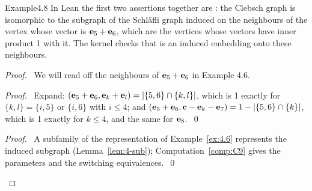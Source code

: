 \begin{cgss}{Example}{4.8}\label{ex:4.8}
 In Lean the first two assertions together are
 : the Clebsch graph is isomorphic to the
 subgraph of the Schl\"afli graph induced on the neighbours of the vertex whose vector is
 ${\mathbf e}_5+{\mathbf e}_6$, which are the vertices whose vectors have inner product 1 with it. The kernel
 checks that  is an induced embedding onto these
 neighbours.
\end{cgss}
\begin{proof}
 \pfsketch\ We will read off the neighbours of ${\mathbf e}_5+{\mathbf e}_6$ in Example 4.6.
 \begin{proof}\pf\ Expand: $({\mathbf e}_5+{\mathbf e}_6,{\mathbf e}_k+{\mathbf e}_l)=|\{5,6\}\cap\{k,l\}|$, which is 1 exactly for $\{k,l\}=\{i,5\}$ or
  $\{i,6\}$ with $i\le4$; and $({\mathbf e}_5+{\mathbf e}_6,{\mathbf c}-{\mathbf e}_k-{\mathbf e}_7)=1-|\{5,6\}\cap\{k\}|$, which is 1
  exactly for $k\le4$, and the same for ${\mathbf e}_8$.~\qed\end{proof}
 \qedstep
 \begin{proof}\pf\ A subfamily of the representation of Example~\ref{ex:4.6} represents the
  induced subgraph (Lemma~\ref{lem:4-sub}); Computation~\ref{comp:C9} gives the
  parameters and the switching equivalences.~\qed\end{proof}
\end{proof}

